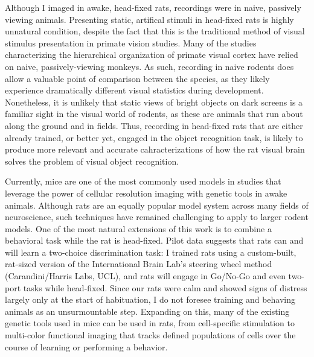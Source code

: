 Although I imaged in awake, head-fixed rats, recordings were in naive, passively viewing animals. Presenting static, artifical stimuli in head-fixed rats is highly unnatural condition, despite the fact that this is the traditional method of visual stimulus presentation in primate vision studies. Many of the studies characterizing the hierarchical organization of primate visual cortex have relied on naive, passively-viewing monkeys. As such, recording in naive rodents does allow a valuable point of comparison between the species, as they likely experience dramatically different visual statistics during development. Nonetheless, it is unlikely that static views of bright objects on dark screens is a familiar sight in the visual world of rodents, as these are animals that run about along the ground and in fields. Thus, recording in head-fixed rats that are either already trained, or better yet, engaged in the object recognition task, is likely to produce more relevant and accurate cahracterizations of how the rat visual brain solves the problem of visual object recognition. 

Currently, mice are one of the most commonly used models in studies that leverage the power of cellular resolution imaging with genetic tools in awake animals. Although rats are an equally popular model system across many fields of neuroscience, such techniques have remained challenging to apply to larger rodent models. One of the most natural extensions of this work is to combine a behavioral task while the rat is head-fixed. Pilot data suggests that rats can and will learn a two-choice discrimination task: I trained rats using a custom-built, rat-sized version of the International Brain Lab's steering wheel method (Carandini/Harris Labs, UCL), and rats will engage in Go/No-Go and even two-port tasks while head-fixed. Since our rats were calm and showed signs of distress largely only at the start of habituation, I do not foresee training and behaving animals as an unsurmountable step. Expanding on this, many of the existing genetic tools used in mice can be used in rats, from cell-specific stimulation to multi-color functional imaging that tracks defined populations of cells over the course of learning or performing a behavior. 

